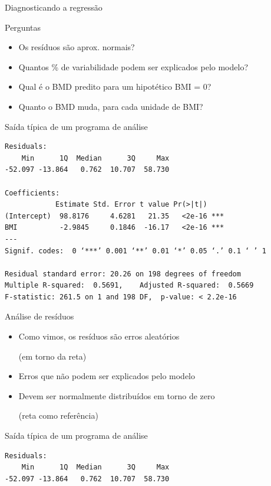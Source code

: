 \documentclass{beamer}
\begin{document}
\begin{frame}[fragile]{Diagnosticando a regressão}
  \begin{block}{Perguntas}
    \begin{itemize}
      \footnotesize
    \item Os resíduos são aprox. normais?
    \item Quantos \% de variabilidade podem ser explicados pelo modelo?
    \item Qual é o BMD predito para um hipotético BMI = 0?
    \item Quanto o BMD muda, para cada unidade de BMI?
    \end{itemize}
  \end{block}
  \begin{exampleblock}{Saída típica de um programa de análise}
    \tiny
\begin{verbatim}
Residuals:
    Min      1Q  Median      3Q     Max 
-52.097 -13.864   0.762  10.707  58.730 

Coefficients:
            Estimate Std. Error t value Pr(>|t|)    
(Intercept)  98.8176     4.6281   21.35   <2e-16 ***
BMI          -2.9845     0.1846  -16.17   <2e-16 ***
---
Signif. codes:  0 ‘***’ 0.001 ‘**’ 0.01 ‘*’ 0.05 ‘.’ 0.1 ‘ ’ 1

Residual standard error: 20.26 on 198 degrees of freedom
Multiple R-squared:  0.5691,	Adjusted R-squared:  0.5669 
F-statistic: 261.5 on 1 and 198 DF,  p-value: < 2.2e-16
\end{verbatim}
\end{exampleblock}
\end{frame}

\begin{frame}[fragile]{Análise de resíduos}
  \begin{itemize}
  \item Como vimos, os resíduos são erros aleatórios

    ({\footnotesize em torno da reta})
    \bigskip
  \item {\small Erros que não podem ser explicados pelo modelo}
    \bigskip

  \item Devem ser normalmente distribuídos em torno de zero

    ({\footnotesize reta como referência})
  \end{itemize}
  \vfill
  \begin{exampleblock}{Saída típica de um programa de análise}
    \footnotesize
\begin{verbatim}
Residuals:
    Min      1Q  Median      3Q     Max 
-52.097 -13.864   0.762  10.707  58.730 
\end{verbatim}
  \end{exampleblock}
\end{frame}
\end{document}
